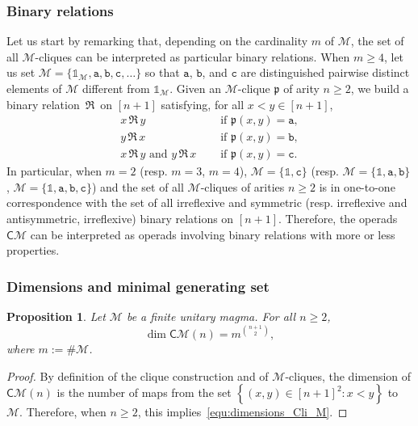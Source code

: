 \documentclass[10pt,reqno]{amsart}
\numberwithin{equation}{subsection}
\renewcommand{\geq}{\geqslant}
\newtheorem{Proposition}[Theorem]{Proposition}
\newcommand{\Mca}{\mathcal{M}}
\newcommand{\Pfr}{\mathfrak{p}}
\newcommand{\Att}{\mathtt{a}}
\newcommand{\Btt}{\mathtt{b}}
\newcommand{\Ctt}{\mathtt{c}}
\newcommand{\Cli}{\mathsf{C}}
\newcommand{\Unit}{\mathds{1}}
\newcommand{\BinRel}{\,\mathfrak{R}\,}
\begin{document}
\subsubsection{Binary relations}
Let us start by remarking that, depending on the cardinality $m$ of
$\Mca$, the set of all $\Mca$-cliques can be interpreted as particular
binary relations. When $m \geq 4$, let us set
$\Mca = \{\Unit_\Mca, \Att, \Btt, \Ctt, \dots\}$ so that $\Att$, $\Btt$,
and $\Ctt$ are distinguished pairwise distinct elements of $\Mca$
different from $\Unit_\Mca$. Given an $\Mca$-clique $\Pfr$ of arity
$n \geq 2$, we build a binary relation $\BinRel$ on $[n + 1]$
satisfying, for all $x < y \in [n + 1]$,
\begin{equation}\begin{split}
    x \BinRel y & \quad \mbox{ if } \Pfr(x, y) = \Att, \\
    y \BinRel x & \quad \mbox{ if } \Pfr(x, y) = \Btt, \\
    x \BinRel y \mbox{ and } y \BinRel x
        & \quad \mbox{ if } \Pfr(x, y) = \Ctt.
\end{split}\end{equation}
In particular, when $m = 2$ (resp. $m = 3$, $m = 4$),
$\Mca = \{\Unit, \Ctt\}$ (resp. $\Mca = \{\Unit, \Att, \Btt\}$,
$\Mca = \{\Unit, \Att, \Btt, \Ctt\}$) and the set of all $\Mca$-cliques
of arities $n \geq 2$ is in one-to-one correspondence with the set of all
irreflexive and symmetric (resp. irreflexive and antisymmetric,
irreflexive) binary relations on $[n + 1]$. Therefore, the operads
$\Cli\Mca$ can be interpreted as operads involving binary relations with
more or less properties.
\medskip

\subsubsection{Dimensions and minimal generating set}

\begin{Proposition} \label{prop:dimensions_Cli_M}
    Let $\Mca$ be a finite unitary magma. For all $n \geq 2$,
    \begin{equation} \label{equ:dimensions_Cli_M}
        \dim \Cli\Mca(n) = m^{\binom{n + 1}{2}},
    \end{equation}
    where $m := \# \Mca$.
\end{Proposition}
\begin{proof}
    By definition of the clique construction and of $\Mca$-cliques, the
    dimension of $\Cli\Mca(n)$ is the number of maps from the set
    $\left\{(x, y) \in [n + 1]^2 : x < y\right\}$ to $\Mca$. Therefore,
    when $n \geq 2$, this implies~\eqref{equ:dimensions_Cli_M}.
\end{proof}
\medskip
\end{document}
